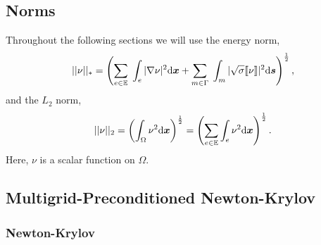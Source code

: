 \subsection{Norms}


Throughout the following sections we will use the energy norm,
  \begin{equation}
  \label{eq:energynorm}
 ||\nu||_{*} = \left(\sum_{\substack{e \in \mathbb{E}}}\; \int_e |\nabla \nu |^{2} \mathrm{d}\boldsymbol{x} + \sum\limits_{m \in \Gamma}\; \int_m|\sqrt{\sigma} \llbracket \nu \rrbracket |^{2} \mathrm{d} \boldsymbol{s} \right)^{\frac{1}{2}},
 \end{equation}
and the $L_2$ norm,
 \begin{equation}
  \label{eq:l2norm}
  ||\nu||_{2}
  = \left(\int_{\Omega}\nu^2\mathrm{d}\boldsymbol{x}\right)^{\frac{1}{2}} 
 = \left(\sum_{\substack{e \in \mathbb{E}}}
  \int_{e}\nu^2\mathrm{d}\boldsymbol{x}\right)^{\frac{1}{2}}.
\end{equation}
Here, $\nu$ is a scalar function on $\Omega$.

\subsection{Multigrid-Preconditioned Newton-Krylov}

\subsubsection{Newton-Krylov}

